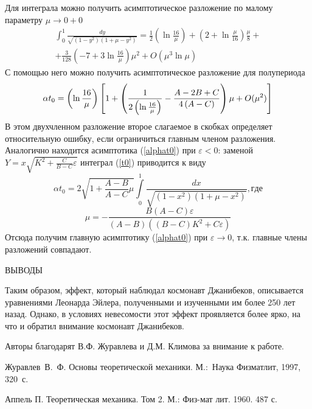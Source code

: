 \documentclass[14pt,a4paper]{extarticle}
\def\DS{\displaystyle}
\def\eps{\varepsilon}
\begin{document}
Для интеграла можно получить асимптотическое разложение по малому параметру $\mu\rightarrow 0+0$
$$\begin{array}{l} \DS\int_{0}^{1}\frac{dy}{\sqrt{\left( 1-y^{2}\right) \left(
1+\mu -y^{2}\right) }}=\frac{1}{2}\left( \ln \frac{16}{\mu }\right) +\left(2+\ln 
\frac{\mu }{16}\right)\frac{\mu }{8}+\\[2ex]+\DS\frac{3}{128}\left(-7+3\ln \frac{16}{\mu }\right)\mu
^{2}+O(\mu ^{3}\ln \mu)\end{array} $$
С помощью него можно получить асимптотическое разложение для полупериода 
$$\alpha t_{0}=
\left( \ln \frac{16}{\mu }\right) \left[ 1+\left( \frac{1}{2\left( \ln \frac{%
16}{\mu }\right) }-\frac{A-2B+C}{4\left( A-C\right) }\right) \mu +O(\mu ^{2})%
\right] $$
В этом двухчленном разложение второе слагаемое в скобках определяет относительную ошибку, если ограничиться главным членом разложения.\\
Аналогично находится асимптотика (\ref{alphat0}) при $\eps<0$: заменой $Y=x\sqrt{K^2+\frac{C}{B-C}\varepsilon}$ интеграл (\ref{t0}) приводится к виду
$$
\alpha t_0=2\sqrt{1+\frac{A-B}{A-C}\mu}{\int\limits_{0}^{1}\frac{dx}{\sqrt{(1-x^2)(1+\mu-x^2)}}}, где
$$
$$
\mu=-\frac{B(A-C)\varepsilon}{\left(A-B\right)\left((B-C)K^2+C\varepsilon\right)}
$$
Отсюда получим главную асимптотику (\ref{alphat0}) при $\eps\rightarrow 0$, т.к. главные члены разложений совпадают.

\newpage


{ВЫВОДЫ} 


\smallskip
Таким образом, эффект, который наблюдал космонавт Джанибеков, описывается уравнениями Леонарда Эйлера, полученными и изученными им более 250 лет назад. Однако, в условиях невесомости этот эффект проявляется более ярко, на что и обратил внимание космонавт Джанибеков. 


\smallskip

Авторы благодарят В.Ф. Журавлева и Д.М. Климова за внимание к работе.

\begin{thebibliography}{99}
 Журавлев~В.~Ф. Основы теоретической механики.
М.:~Наука Физматлит, 1997, 320~с.

 Аппель П. Теоретическая механика. Том 2. М.: Физ-мат лит. 1960. 487 с.
\end{thebibliography}
\end{document}

